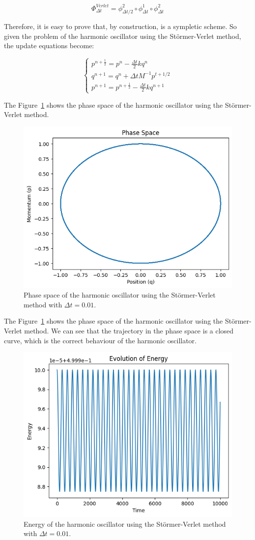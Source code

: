 \documentclass{article}
\begin{document}
\[
	\Phi^{Verlet}_{\Delta t} = \phi^2_{\Delta t/2} \circ \phi^1_{\Delta t} \circ \phi^2_{\Delta t}
\]


Therefore, it is easy to prove that, by construction, is a sympletic scheme. So given the problem of the harmonic oscillator using the Störmer-Verlet method, the update equations become:

\begin{equation}
	\begin{cases}
		p^{n + \frac{1}{2}} = p^n - \frac{\Delta t}{2} kq^n \\
		q^{n+1} = q^{n} + \Delta t M^{-1} p^{t+1/2} \\
		p^{n+1} = p^{n+\frac{1}{2}} - \frac{\Delta t}{2} kq^{n+1}
	\end{cases}
	\label{eq:stormerverletharmonic}
\end{equation}

The Figure~\ref{fig:stormerverletphase} shows the phase space of the harmonic oscillator using the Störmer-Verlet method.

\begin{figure}[H]
	\centering
	\includegraphics[width=0.5\linewidth]{./Figures/Sympletic/verletphase.png}
	\caption{Phase space of the harmonic oscillator using the Störmer-Verlet method with \(\Delta t = 0.01\).}
	\label{fig:stormerverletphase}
\end{figure}

The Figure~\ref{fig:stormerverletphase} shows the phase space of the harmonic oscillator using the Störmer-Verlet method. We can see that the trajectory in the phase space is a closed curve, which is the correct behaviour of the harmonic oscillator.

\begin{figure}[H]
	\centering
	\includegraphics[width=0.5\linewidth]{./Figures/Sympletic/verletenergy.png}
	\caption{Energy of the harmonic oscillator using the Störmer-Verlet method with \(\Delta t = 0.01\).}
	\label{fig:stormerverletenergy}
\end{figure}
\end{document}
